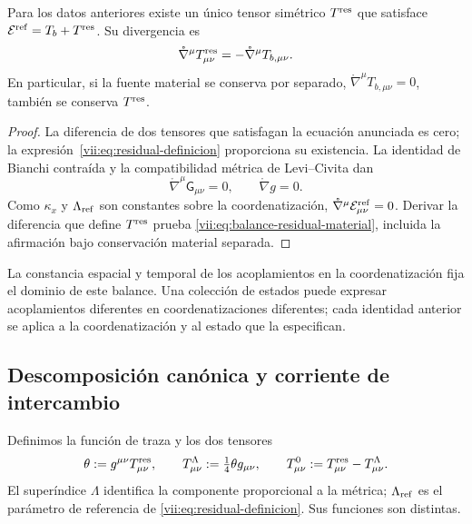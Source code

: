 \begin{theorem}
\label{vii:thm:residual-unicidad-balance}
Para los datos anteriores existe un único tensor simétrico
\(T^{\rm res}\) que satisface
\(\mathcal E^{\rm ref}=T_b+T^{\rm res}\). Su divergencia es
\begin{equation}
 \mathring\nabla^\mu T^{\rm res}_{\mu\nu}
 =-\mathring\nabla^\mu T_{b,\mu\nu}.
 \label{vii:eq:balance-residual-material}
\end{equation}
En particular, si la fuente material se conserva por separado,
\(\mathring\nabla^\mu T_{b,\mu\nu}=0\), también se conserva
\(T^{\rm res}\).
\end{theorem}
\begin{proof}
La diferencia de dos tensores que satisfagan la ecuación anunciada es
cero; la expresión~\eqref{vii:eq:residual-definicion} proporciona su
existencia. La identidad de Bianchi contraída y la compatibilidad métrica
de Levi--Civita dan
\[
 \mathring\nabla^\mu\mathsf G_{\mu\nu}=0,
 \qquad \mathring\nabla g=0.
\]
Como \(\kappa_x\) y \(\Lambda_{\rm ref}\) son constantes sobre la
coordenatización, \(\mathring\nabla^\mu\mathcal E^{\rm ref}_{\mu\nu}=0\).
Derivar la diferencia que define \(T^{\rm res}\) prueba
\eqref{vii:eq:balance-residual-material}, incluida la afirmación bajo
conservación material separada.
\end{proof}

La constancia espacial y temporal de los acoplamientos en la coordenatización fija
el dominio de este balance. Una colección de estados puede expresar
acoplamientos diferentes en coordenatizaciones diferentes; cada identidad anterior
se aplica a la coordenatización y al estado que la especifican.

\subsection{Descomposición canónica y corriente de intercambio}
\label{vii:subsec:traza-corriente-residual}

Definimos la función de traza y los dos tensores
\begin{equation}
 \theta:=g^{\mu\nu}T^{\rm res}_{\mu\nu},\qquad
 T^{\Lambda}_{\mu\nu}:=\tfrac14\theta g_{\mu\nu},\qquad
 T^{0}_{\mu\nu}:=T^{\rm res}_{\mu\nu}-T^{\Lambda}_{\mu\nu}.
 \label{vii:eq:descomposicion-traza-residual}
\end{equation}
El superíndice \(\Lambda\) identifica la componente proporcional a la
métrica; \(\Lambda_{\rm ref}\) es el parámetro de referencia de
\eqref{vii:eq:residual-definicion}. Sus funciones son distintas.

